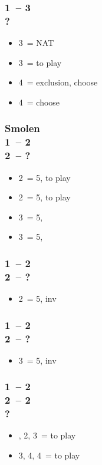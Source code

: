 \documentclass[12pt, a4paper]{article}
\begin{document}
\subsubsection*{1\ntx\ -- 3\hearts \\ ?}
\begin{itemize}
    \item 3\spades\ = NAT
    \item 3\nt\ = to play
    \item 4\hearts\ = exclusion, choose \minor
    \item 4\nt\ = choose \minor
\end{itemize}

\subsubsection*{Smolen \\
                1\ntx\ -- 2\clubs \\
                2\diams\ -- ?}
\begin{itemize}
    \item 2\hearts\ = 5\spades, to play
    \item 2\spades\ = 5\hearts, to play
    \item 3\hearts\ = 5\hearts, \gf
    \item 3\spades\ = 5\spades, \gf
\end{itemize}

\subsubsection*{1\ntx\ -- 2\diams \\
                2\hearts\ -- ?}
\begin{itemize}
    \item 2\spades\ = 5\spades, inv
\end{itemize}

\subsubsection*{1\ntx\ -- 2\hearts \\
                2\spades\ -- ?}
\begin{itemize}
    \item 3\hearts\ = 5\hearts, inv
\end{itemize}

\subsubsection*{1\ntx\ -- 2\diams \\
                2\hearts\ -- 2\spades \\
                ?}
\begin{itemize}
    \item \pass, 2\nt, 3\hearts\ = to play
    \item 3\nt, 4\hearts, 4\spades\ = to play
\end{itemize}
\end{document}

